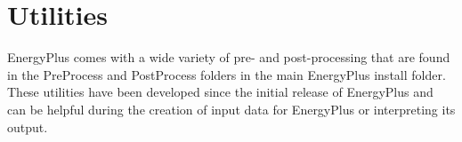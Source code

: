 \chapter{Utilities}\label{utilities}

EnergyPlus comes with a wide variety of pre- and post-processing that are found in the PreProcess and PostProcess folders in the main EnergyPlus install folder.  These utilities have been developed since the initial release of EnergyPlus and can be helpful during the creation of input data for EnergyPlus or interpreting its output.